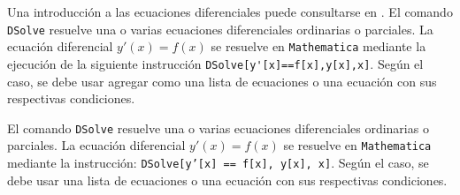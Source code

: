       Una introducción a las ecuaciones diferenciales puede consultarse en \textcite{apostol_calculus_1999}.
      El comando \verb"DSolve"  resuelve una o varias ecuaciones diferenciales ordinarias o parciales.
      La ecuación diferencial $y'(x)=f(x)$ se resuelve en \verb"Mathematica" mediante la ejecución de la siguiente instrucción
      \verb"DSolve[y'[x]==f[x],y[x],x]". Según el caso, se debe usar agregar como una lista de ecuaciones o una ecuación con sus respectivas condiciones.

      \begin{graybox}
        El comando \texttt{DSolve} resuelve una o varias ecuaciones diferenciales ordinarias o parciales.
        La ecuación diferencial $y'(x) = f(x)$ se resuelve en \texttt{Mathematica} mediante la instrucción:
        \texttt{DSolve[y'[x] == f[x], y[x], x]}.
        Según el caso, se debe usar una lista de ecuaciones o una ecuación con sus respectivas condiciones.
      \end{graybox}

